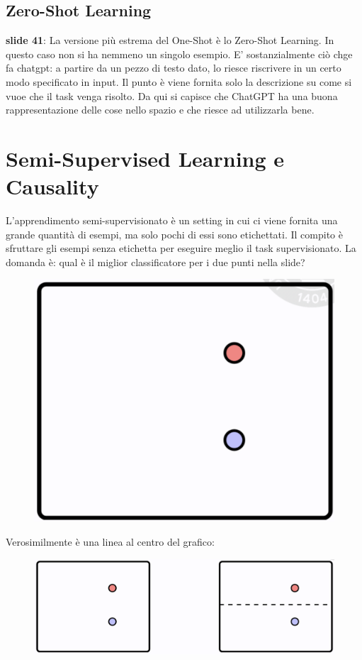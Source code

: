 \subsection{Zero-Shot Learning}
\textbf{slide 41}: La versione più estrema del One-Shot è lo Zero-Shot Learning. In questo caso non si ha
nemmeno un singolo esempio. E' sostanzialmente ciò chge fa chatgpt: a partire da un pezzo di testo dato, 
lo riesce riscrivere in un certo modo specificato in input. Il punto è viene fornita solo la descrizione 
su come si vuoe che il task venga risolto. Da qui si capisce che ChatGPT ha una buona rappresentazione 
delle cose nello spazio e che riesce ad utilizzarla bene.
\newpage
\section{Semi-Supervised Learning e Causality}
L'apprendimento semi-supervisionato è un setting in cui ci viene fornita una grande quantità di esempi, 
ma solo pochi di essi sono etichettati. Il compito è sfruttare gli esempi senza etichetta per eseguire 
meglio il task supervisionato. La domanda è: qual è il miglior classificatore per i due punti nella slide?
\begin{figure}[!h]
  \includegraphics[scale=.25]{images/representation_learning/ssl01.png}
  \centering
\end{figure}


Verosimilmente è una linea al centro del grafico:
\begin{figure}[!h]
  \includegraphics[scale=.3]{images/representation_learning/ssl02.png}
  \centering
\end{figure}


